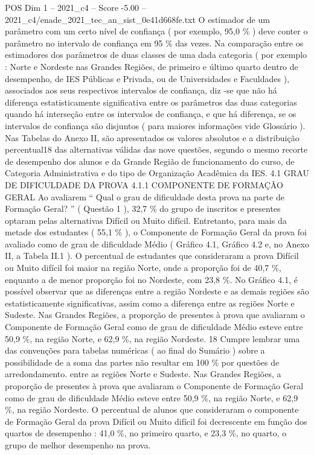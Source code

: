 \begin{textsample}{POS Dim 1 – 2021\_c4 – Score -5.00 – 2021\_c4/enade\_2021\_tec\_an\_sist\_0e41d668fe.txt}
O estimador de um parâmetro com um certo nível de confiança ( por exemplo, 95,0 \% ) deve conter o parâmetro no intervalo de confiança em 95 \% das vezes.
Na comparação entre os estimadores dos parâmetros de duas classes de uma dada categoria ( por exemplo : Norte e Nordeste nas Grandes Regiões, de primeiro e último quarto dentro de desempenho, de IES Públicas e Privada, ou de Universidades e Faculdades ), associados aos seus respectivos intervalos de confiança, diz -se que não há diferença estatisticamente significativa entre os parâmetros das duas categorias quando há interseção entre os intervalos de confiança, e que há diferença, se os intervalos de confiança são disjuntos ( para maiores informações vide Glossário ).
Nas Tabelas do Anexo II, são apresentados os valores absolutos e a distribuição percentual18 das alternativas válidas das nove questões, segundo o mesmo recorte de desempenho dos alunos e da Grande Região de funcionamento do curso, de Categoria Administrativa e do tipo de Organização Acadêmica da IES. 4.1 GRAU DE DIFICULDADE DA PROVA 4.1.1 COMPONENTE DE FORMAÇÃO GERAL Ao avaliarem “ Qual o grau de dificuldade desta prova na parte de Formação Geral? ” ( Questão 1 ), 32,7 \% do grupo de inscritos e presentes optaram pelas alternativas Difícil ou Muito difícil.
Entretanto, para mais da metade dos estudantes ( 55,1 \% ), o Componente de Formação Geral da prova foi avaliado como de grau de dificuldade Médio ( Gráfico 4.1, Gráfico 4.2 e, no Anexo II, a Tabela II.1 ).
O percentual de estudantes que consideraram a prova Difícil ou Muito difícil foi maior na região Norte, onde a proporção foi de 40,7 \%, enquanto a de menor proporção foi no Nordeste, com 23,8 \%.
No Gráfico 4.1, é possível observar que as diferenças entre a região Nordeste e as demais regiões são estatisticamente significativas, assim como a diferença entre as regiões Norte e Sudeste.
Nas Grandes Regiões, a proporção de presentes à prova que avaliaram o Componente de Formação Geral como de grau de dificuldade Médio esteve entre 50,9 \%, na região Norte, e 62,9 \%, na região Nordeste. 18 Cumpre lembrar uma das convenções para tabelas numéricas ( ao final do Sumário ) sobre a possibilidade de a soma das partes não resultar em 100 \% por questões de arredondamento. entre as regiões Norte e Sudeste.
Nas Grandes Regiões, a proporção de presentes à prova que avaliaram o Componente de Formação Geral como de grau de dificuldade Médio esteve entre 50,9 \%, na região Norte, e 62,9 \%, na região Nordeste.
O percentual de alunos que consideraram o componente de Formação Geral da prova Difícil ou Muito difícil foi decrescente em função dos quartos de desempenho : 41,0 \%, no primeiro quarto, e 23,3 \%, no quarto, o grupo de melhor desempenho na prova.

\end{textsample}
